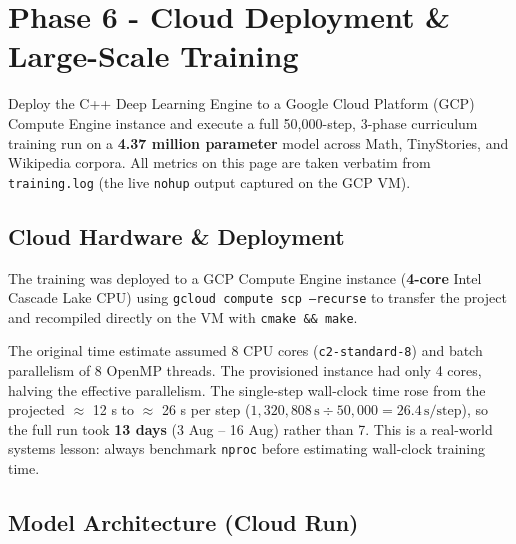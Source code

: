 \documentclass[12pt, a4paper]{article}
\begin{document}
\section{Phase 6 - Cloud Deployment \& Large-Scale Training}

\begin{tcolorbox}[designbox, title={Phase 6 Goal}]
  Deploy the C++ Deep Learning Engine to a Google Cloud Platform (GCP) Compute
  Engine instance and execute a full 50,000-step, 3-phase curriculum training run
  on a \textbf{4.37 million parameter} model across Math, TinyStories, and Wikipedia
  corpora. All metrics on this page are taken verbatim from
  \texttt{training.log} (the live \texttt{nohup} output captured on the GCP VM).
\end{tcolorbox}

\subsection{Cloud Hardware \& Deployment}

The training was deployed to a GCP Compute Engine instance (\textbf{4-core} Intel
Cascade Lake CPU) using \texttt{gcloud compute scp --recurse} to transfer the project
and recompiled directly on the VM with \texttt{cmake \&\& make}.

\begin{tcolorbox}[interviewbox,
    title={Interview: Why 13 days instead of the planned 7?}]
  The original time estimate assumed 8 CPU cores (\texttt{c2-standard-8}) and
  batch parallelism of 8 OpenMP threads.  The provisioned instance had only
  4 cores, halving the effective parallelism.  The single-step wall-clock time
  rose from the projected $\approx$ 12 s to $\approx$ 26 s per step
  ($1{,}320{,}808\,\text{s} \div 50{,}000 = 26.4\,\text{s/step}$), so the
  full run took \textbf{13 days} (3 Aug -- 16 Aug) rather than 7.
  This is a real-world systems lesson: always benchmark
  \texttt{nproc} before estimating wall-clock training time.
\end{tcolorbox}

\subsection{Model Architecture (Cloud Run)}
\end{document}
